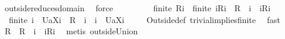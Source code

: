 \begin{isabellebody}
\ outside{\isacharunderscore}reduces{\isacharunderscore}domain\ \isamarkupfalse%
\ force\isanewline
\ \ \isamarkupfalse%
\ \isamarkupfalse%
\ \isanewline
\ \ {}{\isacharcolon}\ {\isachardoublequoteopen}finite\ {\isacharparenleft}{\isacharquery}R{\isacharminus}{\isacharminus}i{\isacharparenright}\ {\isacharampersand}\ finite\ {\isacharparenleft}{\isacharbraceleft}i{\isacharbraceright}{\isasymtimes}{\isacharparenleft}{\isacharquery}R{\isacharbackquote}{\isacharbackquote}{\isacharbraceleft}i{\isacharbraceright}{\isacharparenright}{\isacharparenright}\ {\isacharampersand}\ {\isacharparenleft}{\isacharquery}R\ {\isacharminus}{\isacharminus}\ i{\isacharparenright}\ {\isasyminter}\ {\isacharparenleft}{\isacharbraceleft}i{\isacharbraceright}{\isasymtimes}{\isacharparenleft}{\isacharquery}R{\isacharbackquote}{\isacharbackquote}{\isacharbraceleft}i{\isacharbraceright}{\isacharparenright}{\isacharparenright}{\isacharequal}{\isacharbraceleft}{\isacharbraceright}\ {\isacharampersand}\ \isanewline
\ \ finite\ {\isacharparenleft}{\isacharbraceleft}i{\isacharbraceright}\ {\isasymtimes}\ {\isacharbraceleft}{\isacharquery}U{\isacharparenleft}a{\isacharbackquote}{\isacharbackquote}{\isacharparenleft}X{\isasymunion}{\isacharbraceleft}i{\isacharbraceright}{\isacharparenright}{\isacharparenright}{\isacharbraceright}{\isacharparenright}\ {\isacharampersand}\ {\isacharparenleft}{\isacharquery}R\ {\isacharminus}{\isacharminus}\ i{\isacharparenright}\ {\isasyminter}\ {\isacharparenleft}{\isacharbraceleft}i{\isacharbraceright}\ {\isasymtimes}\ {\isacharbraceleft}{\isacharquery}U{\isacharparenleft}a{\isacharbackquote}{\isacharbackquote}{\isacharparenleft}X{\isasymunion}{\isacharbraceleft}i{\isacharbraceright}{\isacharparenright}{\isacharparenright}{\isacharbraceright}{\isacharparenright}{\isacharequal}{\isacharbraceleft}{\isacharbraceright}{\isachardoublequoteclose}\ \isanewline
\ \ \isamarkupfalse%
\ Outside{\isacharunderscore}def\ trivial{\isacharunderscore}implies{\isacharunderscore}finite\ \isamarkupfalse%
\ fast\ \isanewline
\ \ \isamarkupfalse%
\ {\isachardoublequoteopen}{\isacharquery}R\ {\isacharequal}\ {\isacharparenleft}{\isacharquery}R\ {\isacharminus}{\isacharminus}\ i{\isacharparenright}\ {\isasymunion}\ {\isacharparenleft}{\isacharbraceleft}i{\isacharbraceright}{\isasymtimes}{\isacharquery}R{\isacharbackquote}{\isacharbackquote}{\isacharbraceleft}i{\isacharbraceright}{\isacharparenright}{\isachardoublequoteclose}\ \isamarkupfalse%
\ {\isacharparenleft}metis\ outsideUnion{\isacharparenright}\isanewline

\end{isabellebody}
